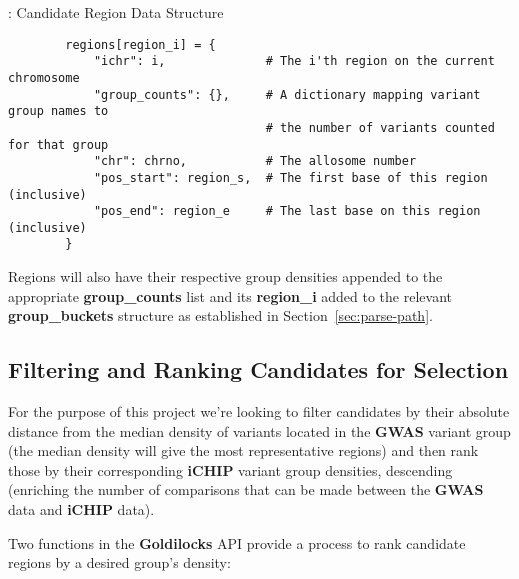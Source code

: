 \begin{listing}[H]
    \caption[candidate-dict]{: Candidate Region Data Structure}
    \label{list:candidate-dict}
    \begin{verbatim}
        regions[region_i] = {
            "ichr": i,              # The i'th region on the current chromosome
            "group_counts": {},     # A dictionary mapping variant group names to
                                    # the number of variants counted for that group
            "chr": chrno,           # The allosome number
            "pos_start": region_s,  # The first base of this region (inclusive)
            "pos_end": region_e     # The last base on this region (inclusive)
        }
    \end{verbatim}
\end{listing}

Regions will also have their respective group densities appended to the
appropriate \textbf{group\_counts} list and its \textbf{region\_i} added to the
relevant \textbf{group\_buckets} structure as established in
Section~\ref{sec:parse-path}.


\subsection{Filtering and Ranking Candidates for Selection}
\label{sec:filter-rank}

For the purpose of this project we're looking to filter candidates by their
absolute distance from the median density of variants located in the
\textbf{GWAS} variant group (the median density will give the most representative
regions) and then rank those by their corresponding \textbf{iCHIP} variant group
densities, descending (enriching the number of comparisons that can be made
between the \textbf{GWAS} data and \textbf{iCHIP} data).

Two functions in the \textbf{Goldilocks} API provide a process to rank candidate
regions by a desired group's density:

